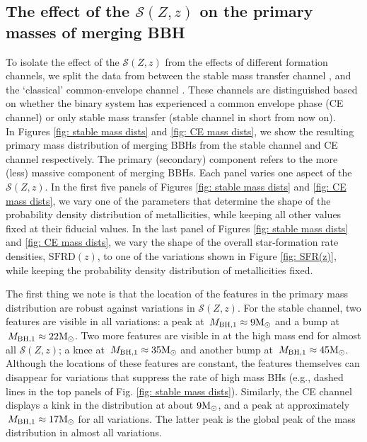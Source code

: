 \documentclass[linenumbers,twocolumn]{aastex631}
\newcommand{\Msun}{\ensuremath{\rm{M}_{\odot}}\xspace}
\newcommand{\Mbheen}{\ensuremath{\,M_{\rm BH, 1}}\xspace}
\newcommand{\SFRDzZ}{\ensuremath{\mathcal{S}(Z,z)}\xspace}
\newcommand{\SFRDz}{\ensuremath{\mathrm{SFRD}(z)}\xspace}
\begin{document}
\subsection{The effect of the \SFRDzZ on the primary masses of merging BBH}
To isolate the effect of the \SFRDzZ from the effects of different formation channels, we split the data from \cite{vanson+2022} between the stable mass transfer channel \citep[e.g.,][]{van-den-Heuvel+2017,Inayoshi2017,Bavera2021,Marchant2021,GallegosGarcia2021,vanson+2022}, and the `classical' common-envelope channel \citep[or CE channel, e.g.,\  ][]{Belczynski+2007,PostnovYungelson2014,Belczynski+2016Natur,vignaGomez+2018}. 
These channels are distinguished based on whether the binary system has experienced a common envelope phase (CE channel) or only stable mass transfer (stable channel in short from now on).\\

In Figures \ref{fig: stable mass dists} and \ref{fig: CE mass dists}, we show the resulting primary mass distribution of merging BBHs from the stable channel and CE channel respectively.
The primary (secondary) component refers to the more (less) massive component of merging BBHs. 
Each panel varies one aspect of the \SFRDzZ. In the first five panels of Figures \ref{fig: stable mass dists} and \ref{fig: CE mass dists}, we vary one of the  parameters that determine the shape of the probability density distribution of metallicities, while keeping all other values fixed at their fiducial values. In the last panel of  Figures \ref{fig: stable mass dists} and \ref{fig: CE mass dists}, we vary the shape of the overall star-formation rate densities, \SFRDz, to one of the variations shown in Figure \ref{fig: SFR(z)}, while keeping the probability density distribution of metallicities fixed.


The first thing we note is that the location of the features in the primary mass distribution are robust against variations in \SFRDzZ.
For the stable channel, two features are visible in all variations: a peak at $\Mbheen\approx9\Msun$ and a bump at $\Mbheen\approx22\Msun$. 
Two more features are visible in at the high mass end for almost all \SFRDzZ; a knee at $\Mbheen\approx35\Msun$ and another bump at $\Mbheen\approx45\Msun$. Although the locations of these features are constant, the features themselves can disappear for variations that suppress the rate of high mass BHs (e.g., dashed lines in the top panels of Fig. \ref{fig: stable mass dists}).  
Similarly, the CE channel displays a kink in the distribution at about $9\Msun$, and a peak at approximately $\Mbheen\approx17\Msun$ for all variations. The latter peak is the global peak of the mass distribution in almost all variations.  
\end{document}
